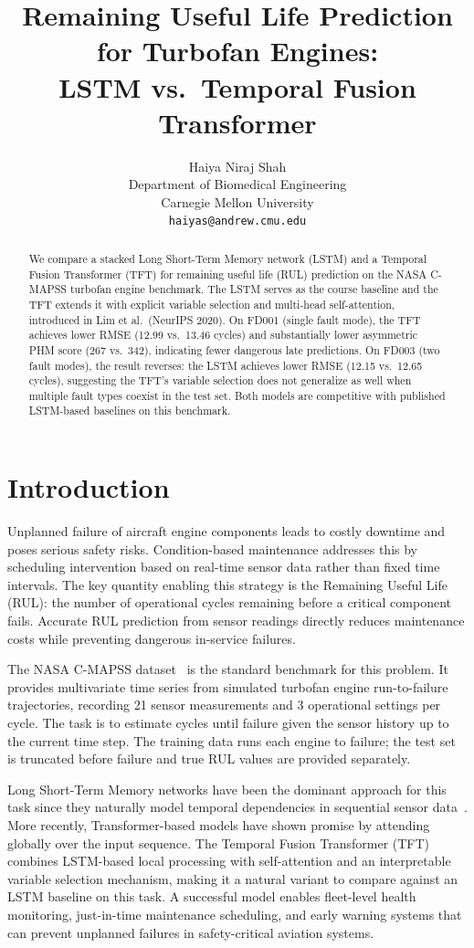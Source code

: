\documentclass{article}
\title{Remaining Useful Life Prediction for Turbofan Engines:\\
LSTM vs.\ Temporal Fusion Transformer}
\author{
  Haiya Niraj Shah \\
  Department of Biomedical Engineering \\
  Carnegie Mellon University \\
  \texttt{haiyas@andrew.cmu.edu}
}
\begin{document}
\maketitle


\begin{abstract}
We compare a stacked Long Short-Term Memory network (LSTM) and a Temporal Fusion Transformer (TFT) for remaining useful life (RUL) prediction on the NASA C-MAPSS turbofan engine benchmark. The LSTM serves as the course baseline and the TFT extends it with explicit variable selection and multi-head self-attention, introduced in Lim et al.\ (NeurIPS 2020). On FD001 (single fault mode), the TFT achieves lower RMSE (12.99 vs.\ 13.46 cycles) and substantially lower asymmetric PHM score (267 vs.\ 342), indicating fewer dangerous late predictions. On FD003 (two fault modes), the result reverses: the LSTM achieves lower RMSE (12.15 vs.\ 12.65 cycles), suggesting the TFT's variable selection does not generalize as well when multiple fault types coexist in the test set. Both models are competitive with published LSTM-based baselines on this benchmark.
\end{abstract}


\section{Introduction}

Unplanned failure of aircraft engine components leads to costly downtime and poses serious safety risks. Condition-based maintenance addresses this by scheduling intervention based on real-time sensor data rather than fixed time intervals. The key quantity enabling this strategy is the Remaining Useful Life (RUL): the number of operational cycles remaining before a critical component fails. Accurate RUL prediction from sensor readings directly reduces maintenance costs while preventing dangerous in-service failures.

The NASA C-MAPSS dataset~\cite{saxena2008} is the standard benchmark for this problem. It provides multivariate time series from simulated turbofan engine run-to-failure trajectories, recording 21 sensor measurements and 3 operational settings per cycle. The task is to estimate cycles until failure given the sensor history up to the current time step. The training data runs each engine to failure; the test set is truncated before failure and true RUL values are provided separately.

Long Short-Term Memory networks have been the dominant approach for this task since they naturally model temporal dependencies in sequential sensor data~\cite{zheng2017}. More recently, Transformer-based models have shown promise by attending globally over the input sequence. The Temporal Fusion Transformer (TFT)~\cite{lim2021} combines LSTM-based local processing with self-attention and an interpretable variable selection mechanism, making it a natural variant to compare against an LSTM baseline on this task. A successful model enables fleet-level health monitoring, just-in-time maintenance scheduling, and early warning systems that can prevent unplanned failures in safety-critical aviation systems.
\end{document}
